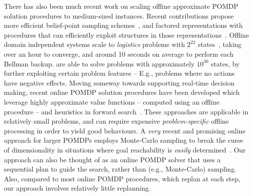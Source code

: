 There has also been much recent work on scaling offline approximate
POMDP solution procedures to medium-sized instances. Recent
contributions propose more efficient belief-point sampling
schemes~\cite{kurniawati:etal:2010,shani:etal:08}, and factored
representations with procedures that can efficiently exploit
structures in those
representations~\cite{brunskill:russell:2010,shani:etal:2008}. Offline
domain independent systems scale to {\em logistics} problems with
$2^{22}$ states~\cite{shani:etal:2008}, taking over an hour to
converge, and around 10 seconds on average to perform each Bellman
backup. \citeauthor{brunskill:russell:2010} are able to solve problems
with approximately $10^{30}$ states, by further exploiting certain
problem features -- E.g., problems where no actions have negative
effects.
Moving someway towards supporting real-time decision making, recent
online POMDP solution procedures have been developed which leverage
highly approximate value functions -- computed using an offline
procedure -- and heuristics in forward
search~\cite{ross:etal:2008}. These approaches are applicable in
relatively small problems, and can require
expensive \emph{problem-specific} offline processing in order to yield
good behaviours.
A {\em very} recent and promising online approach for
larger POMDPs employs Monte-Carlo sampling to break the curse of
dimensionality in situations where goal reachability is {\em easily}
determined~\cite{silver:veness:2010}. 
Our approach can also be thought of as an online POMDP solver that
uses a sequential plan to guide the search, rather than (e.g.,
Monte-Carlo) sampling. Also, compared to most online POMDP procedures, which
replan at each step, our approach involves relatively little replanning.








